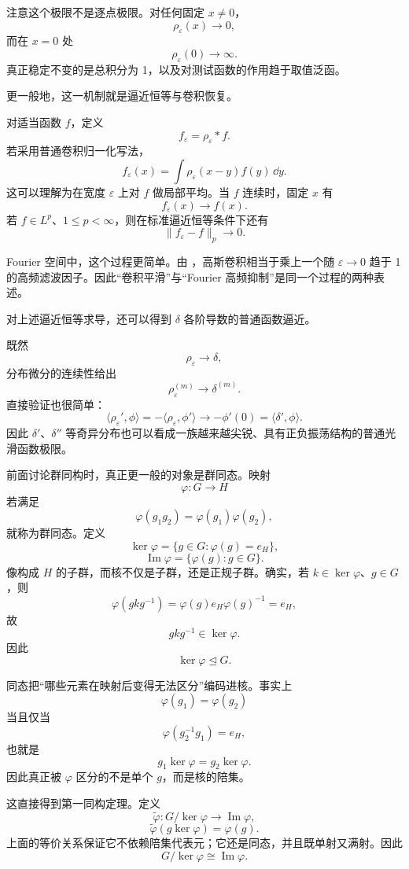 注意这个极限不是逐点极限。对任何固定 $x\neq0$，
\[
\rho_\varepsilon(x)\to0,
\]
而在 $x=0$ 处
\[
\rho_\varepsilon(0)\to\infty.
\]
真正稳定不变的是总积分为 1，以及对测试函数的作用趋于取值泛函。

更一般地，这一机制就是逼近恒等与卷积恢复。

对适当函数 $f$，定义
\[
f_\varepsilon=\rho_\varepsilon*f.
\]
若采用普通卷积归一化写法，
\[
f_\varepsilon(x)
=\int\rho_\varepsilon(x-y)f(y)\,\dd y.
\]
这可以理解为在宽度 $\varepsilon$ 上对 $f$ 做局部平均。当 $f$ 连续时，固定 $x$ 有
\[
f_\varepsilon(x)\to f(x).
\]
若 $f\in L^p$、$1\le p<\infty$，则在标准逼近恒等条件下还有
\[
\|f_\varepsilon-f\|_p\to0.
\]

Fourier 空间中，这个过程更简单。由 ，高斯卷积相当于乘上一个随 $\varepsilon\to0$ 趋于 1 的高频滤波因子。因此“卷积平滑”与“Fourier 高频抑制”是同一个过程的两种表述。

对上述逼近恒等求导，还可以得到 $\delta$ 各阶导数的普通函数逼近。

既然
\[
\rho_\varepsilon\to\delta,
\]
分布微分的连续性给出
\[
\rho_\varepsilon^{(m)}\to\delta^{(m)}.
\]
直接验证也很简单：
\[
\langle\rho_\varepsilon',\phi\rangle
=-\langle\rho_\varepsilon,\phi'\rangle
\longrightarrow-\phi'(0)
=\langle\delta',\phi\rangle.
\]
因此 $\delta'$、$\delta''$ 等奇异分布也可以看成一族越来越尖锐、具有正负振荡结构的普通光滑函数极限。

前面讨论群同构时，真正更一般的对象是群同态。映射
\[
\varphi:G\to H
\]
若满足
\[
\varphi(g_1g_2)=\varphi(g_1)\varphi(g_2),
\]
就称为群同态。定义
\[
\ker\varphi=
\{g\in G:\varphi(g)=e_H\},
\]
\[
\operatorname{Im}\varphi
=\{\varphi(g):g\in G\}.
\]
像构成 $H$ 的子群，而核不仅是子群，还是正规子群。确实，若 $k\in\ker\varphi$、$g\in G$，则
\[
\varphi(gkg^{-1})
=\varphi(g)e_H\varphi(g)^{-1}=e_H,
\]
故
\[
gkg^{-1}\in\ker\varphi.
\]
因此
\[
{\ker\varphi\trianglelefteq G}.
\]

同态把“哪些元素在映射后变得无法区分”编码进核。事实上
\[
\varphi(g_1)=\varphi(g_2)
\]
当且仅当
\[
\varphi(g_2^{-1}g_1)=e_H,
\]
也就是
\[
g_1\ker\varphi=g_2\ker\varphi.
\]
因此真正被 $\varphi$ 区分的不是单个 $g$，而是核的陪集。

这直接得到第一同构定理。定义
\[
\widetilde\varphi:G/\ker\varphi
\longrightarrow \operatorname{Im}\varphi,
\]
\[
\widetilde\varphi(g\ker\varphi)=\varphi(g).
\]
上面的等价关系保证它不依赖陪集代表元；它还是同态，并且既单射又满射。因此
\begin{equation*}{
G/\ker\varphi\cong\operatorname{Im}\varphi
}.\end{equation*}

